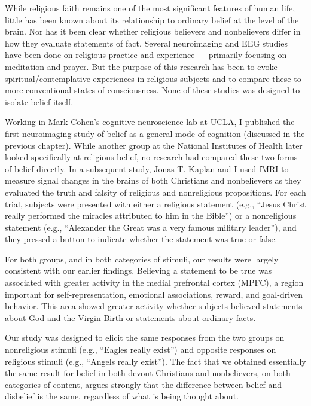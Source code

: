 \documentclass[a4paper,14pt]{extarticle}
\begin{document}
While religious faith remains one of the most significant features of human life, little has been known about its relationship to ordinary belief at the level of the brain.
Nor has it been clear whether religious believers and nonbelievers differ in how they evaluate statements of fact.
Several neuroimaging and EEG studies have been done on religious practice and experience --- primarily focusing on meditation and prayer.
But the purpose of this research has been to evoke spiritual/contemplative experiences in religious subjects and to compare these to more conventional states of consciousness.
None of these studies was designed to isolate belief itself.

Working in Mark Cohen’s cognitive neuroscience lab at UCLA, I published the first neuroimaging study of belief as a general mode of cognition (discussed in the previous chapter).
While another group at the National Institutes of Health later looked specifically at religious belief, no research had compared these two forms of belief directly.
In a subsequent study, Jonas T. Kaplan and I used fMRI to measure signal changes in the brains of both Christians and nonbelievers as they evaluated the truth and falsity of religious and nonreligious propositions.
For each trial, subjects were presented with either a religious statement (e.g., ``Jesus Christ really performed the miracles attributed to him in the Bible'') or a nonreligious statement (e.g., ``Alexander the Great was a very famous military leader''), and they pressed a button to indicate whether the statement was true or false.

For both groups, and in both categories of stimuli, our results were largely consistent with our earlier findings.
Believing a statement to be true was associated with greater activity in the medial prefrontal cortex (MPFC), a region important for self-representation, emotional associations, reward, and goal-driven behavior.
This area showed greater activity whether subjects believed statements about God and the Virgin Birth or statements about ordinary facts.

Our study was designed to elicit the same responses from the two groups on nonreligious stimuli (e.g., ``Eagles really exist'') and opposite responses on religious stimuli (e.g., ``Angels really exist'').
The fact that we obtained essentially the same result for belief in both devout Christians and nonbelievers, on both categories of content, argues strongly that the difference between belief and disbelief is the same, regardless of what is being thought about.
\end{document}
